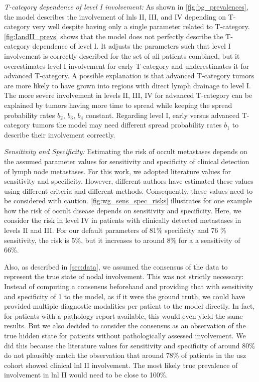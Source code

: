 \documentclass[twocolumn]{aastex631}
\begin{document}
{\it T-category dependence of level I involvement:} As shown in \autoref{fig:bg_prevalences}, the model describes the involvement of \glspl{lnl} II, III, and IV depending on T-category very well despite having only a single parameter related to T-category. \autoref{fig:IandII_prevs} shows that the model does not perfectly describe the T-category dependence of level I. It adjusts the parameters such that level I involvement is correctly described for the set of all patients combined, but it overestimates level I involvement for early T-category and underestimates it for advanced T-category. A possible explanation is that advanced T-category tumors are more likely to have grown into regions with direct lymph drainage to level I. The more severe involvement in levels II, III, IV for advanced T-category can be explained by tumors having more time to spread while keeping the spread probability rates $b_2$, $b_3$, $b_4$ constant. Regarding level I, early versus advanced T-category tumors the model may need different spread probability rates $b_1$ to describe their involvement correctly.

{\it Sensitivity and Specificity:} Estimating the risk of occult metastases depends on the assumed parameter values for sensitivity and specificity of clinical detection of lymph node metastases. For this work, we adopted literature values for sensitivity and specificity. However, different authors have estimated these values using different criteria and different methods. Consequently, these values need to be considered with caution. \autoref{fig:wg_sens_spec_risks} illustrates for one example how the risk of occult disease depends on sensitivity and specificity. Here, we consider the risk in level IV in patients with clinically detected metastases in levels II and III. For our default parameters of 81\% specificity and 76 \% sensitivity, the risk is 5\%, but it increases to around 8\% for a a sensitivity of 66\%.

Also, as described in \autoref{sec:data}, we assumed the consensus of the data to represent the true state of nodal involvement. This was not strictly necessary: Instead of computing a consensus beforehand and providing that with sensitivity and specificity of 1 to the model, as if it were the ground truth, we could have provided multiple diagnostic modalities per patient to the model directly. In fact, for patients with a pathology report available, this would even yield the same results. But we also decided to consider the consensus as an observation of the true hidden state for patients without pathologically assessed involvement. We did this because the literature values for sensitivity and specificity of around 80\% do not plausibly match the observation that around 78\% of patients in the \gls{usz} cohort showed clinical \gls{lnl} II involvement. The most likely true prevalence of involvement in \gls{lnl} II would need to be close to 100\%.
\end{document}
